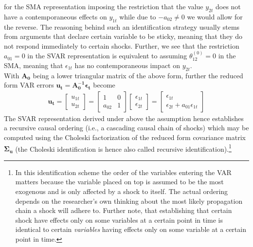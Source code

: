 \documentclass[a4paper,11pt,listof=nochaptergap,oneside,pointednumbers,bibtotoc,bigheadings,liststotoc]{scrbook}
\theoremstyle{mysatz}
\theoremstyle{mydefinition}
\theoremstyle{mybemerkung}
\newcommand{\vect}[1]{\boldsymbol{\mathbf{#1}}}
\begin{document}
for the SMA representation imposing the restriction that the value $y_{2t}$ does not have a contemporaneous effects on $y_{1t}$ while due to $-a_{02} \neq 0$ we would allow for the reverse. The reasoning behind such an identification strategy usually stems from arguments that declare certain variable to be sticky, meaning that they do not respond immediately to certain shocks. Further, we see that the restriction $a_{01}=0$ in the SVAR representation is equivalent to assuming $\theta_{12}^{(0)}=0$ in the SMA, meaning that $\epsilon_{1t}$ has no contemporaneous impact on $y_{2t}$.\\
With $\vect{A_0}$ being a lower triangular matrix of the above form, further the reduced form VAR errors $\vect{u_t} = \vect{A_0^{-1}}\vect{\epsilon_t}$ become
\begin{equation} \label{eq:svar13}
\begin{split}
 		\vect{u_t} = \begin{bmatrix}
    					u_{1t} \\
					u_{2t} 
 					\end{bmatrix} = 
						\begin{bmatrix}
    						1 & 0 \\
						a_{02} & 1  
 						\end{bmatrix} 
							\begin{bmatrix}
    							\epsilon_{1t} \\
							\epsilon_{2t} 
 							\end{bmatrix} = 
								\begin{bmatrix}
    								\epsilon_{1t} \\
								\epsilon_{2t}+a_{01}\epsilon_{1t} 
 								\end{bmatrix} 			
\end{split}								
\end{equation}
The SVAR representation derived under above the assumption hence establishes a recursive causal ordering (i.e., a cascading causal chain of shocks) which may be computed using the Choleski factorization of the reduced form covariance matrix $\vect{\Sigma_u}$ (the Choleski identification is hence also called recursive identification).\footnote{In this identification scheme the order of the variables entering the VAR matters because the variable placed on top is assumed to be the most exogenous and is only affected by a shock to itself. The actual ordering depends on the researcher's own thinking about the most likely propagation chain a shock will adhere to. Further note, that establishing that certain shock have effects only on some variables at a certain point in time is identical to certain \textit{variables} having effects only on some variable at a certain point in time.} 
\end{document}
